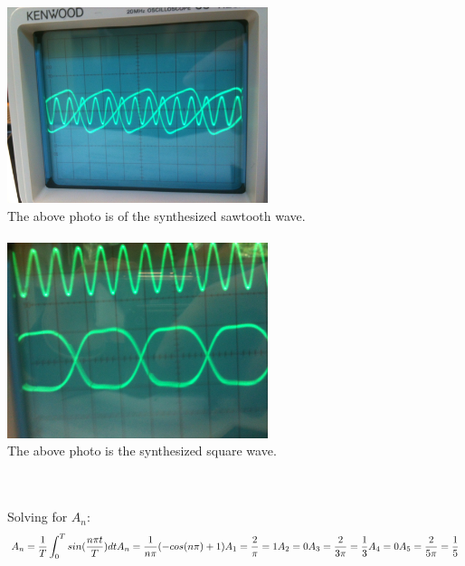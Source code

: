\documentclass[a4paper,12pt]{article}
\begin{document}
\begin{center}
  \includegraphics[width=3in]{photo1.jpg} \\
  
  The above photo is of the synthesized sawtooth wave. \\ \\
  
  \includegraphics[width=3in]{photo2.jpg} \\
  
  The above photo is the synthesized square wave.
  \end{center} \\ \\

  
  Solving for $A_n$: \\
  
  \[
  A_n = \frac{1}{T}\int_0^T sin(\frac{n{\pi}t}{T})dt \\
  A_n = \frac{1}{n{\pi}}(-cos(n{\pi}) + 1) \\ \\
  
  A_1 = \frac{2}{{\pi}} = 1 \\
  A_2 = 0 \\
  A_3 = \frac{2}{3{\pi}} = \frac{1}{3} \\
  A_4 = 0 \\
  A_5 = \frac{2}{5{\pi}} = \frac{1}{5} \\
  \]
  
\end{document}
